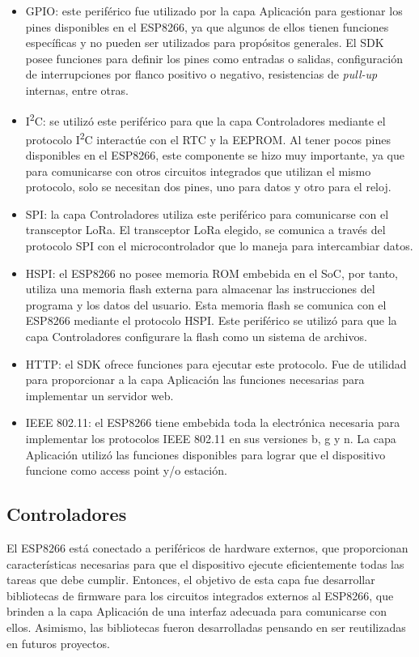 \begin{itemize}
	\item GPIO: este periférico fue utilizado por la capa Aplicación para gestionar los pines disponibles en el ESP8266, ya que algunos de ellos tienen funciones específicas y no pueden ser utilizados para propósitos generales. El SDK posee funciones para definir los pines como entradas o salidas, configuración de interrupciones por flanco positivo o negativo, resistencias de \textit{pull-up} internas, entre otras.
	\item I\textsuperscript{2}C: se utilizó este periférico para que la capa Controladores mediante el protocolo I\textsuperscript{2}C interactúe con el RTC y la EEPROM. Al tener pocos pines disponibles en el ESP8266, este componente se hizo muy importante, ya que para comunicarse con otros circuitos integrados que utilizan el mismo protocolo, solo se necesitan dos pines, uno para datos y otro para el reloj.
	\item SPI: la capa Controladores utiliza este periférico para comunicarse con el transceptor LoRa. El transceptor LoRa elegido, se comunica a través del protocolo SPI con el microcontrolador que lo maneja para intercambiar datos.
	\item HSPI: el ESP8266 no posee memoria ROM embebida en el SoC, por tanto, utiliza una memoria flash externa para almacenar las instrucciones del programa y los datos del usuario. Esta memoria flash se comunica con el ESP8266 mediante el protocolo HSPI. Este periférico se utilizó para que la capa Controladores configurare la flash como un sistema de archivos.
	\item HTTP: el SDK ofrece funciones para ejecutar este protocolo. Fue de utilidad para proporcionar a la capa Aplicación las funciones necesarias para implementar un servidor web.
	\item IEEE 802.11: el ESP8266 tiene embebida toda la electrónica necesaria para implementar los protocolos IEEE 802.11 en sus versiones b, g y n. La capa Aplicación utilizó las funciones disponibles para lograr que el dispositivo funcione como access point y/o estación.
\end{itemize}

\subsection{Controladores}

El ESP8266 está conectado a periféricos de hardware externos, que proporcionan características necesarias para que el dispositivo ejecute eficientemente todas las tareas que debe cumplir. Entonces, el objetivo de esta capa fue desarrollar bibliotecas de firmware para los circuitos integrados externos al ESP8266, que brinden a la capa Aplicación de una interfaz adecuada para comunicarse con ellos. Asimismo, las bibliotecas fueron desarrolladas pensando en ser reutilizadas en futuros proyectos.

